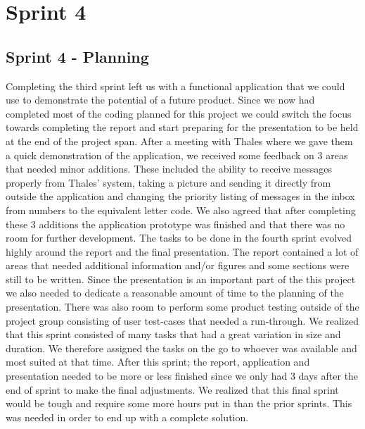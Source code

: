 \chapter{Sprint 4}

\section{Sprint 4 - Planning}


Completing the third sprint left us with a functional application that we could use to demonstrate the potential of a future product. Since we now had completed most of the coding planned for this project we could switch the focus towards completing the report and start preparing for the presentation to be held at the end of the project span.
\newline
\newline
After a meeting with Thales where we gave them a quick demonstration of the application, we received some feedback on 3 areas that needed minor additions. These included the ability to receive messages properly from Thales' system, taking a picture and sending it directly from outside the application and changing the priority listing of messages in the inbox from numbers to the equivalent letter code. We also agreed that after completing these 3 additions the application prototype was finished and that there was no room for further development.
\newline
\newline
The tasks to be done in the fourth sprint evolved highly around the report and the final presentation. The report contained a lot of areas that needed additional information and/or figures and some sections were still to be written. Since the presentation is an important part of the this project we also needed to dedicate a reasonable amount of time to the planning of the presentation. There was also room to perform some product testing outside of the project group consisting of user test-cases that needed a run-through. We realized that this sprint consisted of many tasks that had a great variation in size and duration. We therefore assigned the tasks on the go to whoever was available and most suited at that time.
\newline
\newline
After this sprint; the report, application and presentation needed to be more or less finished since we only had 3 days after the end of sprint to make the final adjustments. We realized that this final sprint would be tough and require some more hours put in than the prior sprints. This was needed in order to end up with a complete solution. 
      